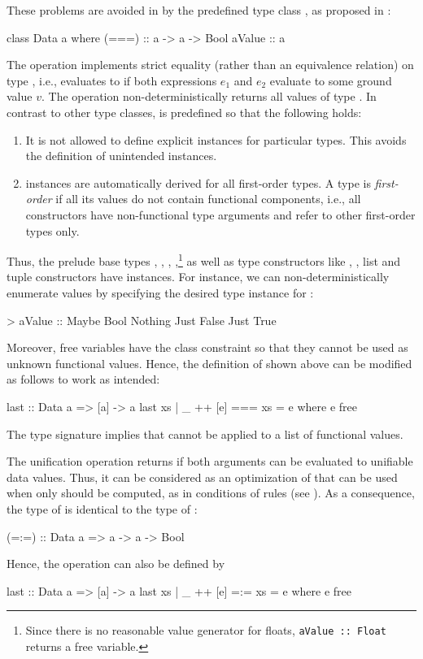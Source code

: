 These problems are avoided in \CYS by the predefined type class
,
as proposed in \cite{HanusTeegen20}:
%
\begin{curry}
class Data a where
  (===)  :: a -> a -> Bool
  aValue :: a
\end{curry}
%
The operation \ccode{===}\pindex{===} implements strict equality
(rather than an equivalence relation) on type ,
i.e.,  evaluates to 
if both expressions $e_1$ and $e_2$ evaluate to some ground value $v$.
The operation  non-deterministically returns
all values of type .
In contrast to other type classes,  is predefined
so that the following holds:
%
\begin{enumerate}
\item
It is not allowed to define explicit  instances
for particular types. This avoids the definition of unintended instances.
\item
{} instances are automatically derived
for all first-order types.
A type is \emph{first-order} if all its values
do not contain functional components,
i.e., all constructors have non-functional type arguments and
refer to other first-order types only.
\end{enumerate}
%
Thus, the prelude base types , , ,
,\footnote{Since there is no reasonable value generator
for floats, \texttt{aValue~::~Float} returns a free variable.}
 as well as type constructors like
, , list and tuple constructors
have  instances.
For instance, we can non-deterministically enumerate values
by specifying the desired type instance for :
%
\begin{curry}
> aValue :: Maybe Bool
Nothing
Just False
Just True
\end{curry}
%
Moreover, free variables have the class constraint 
so that they cannot be used as unknown functional values.
Hence, the definition of  shown above
can be modified as follows to work as intended:
%
\begin{curry}
last :: Data a => [a] -> a
last xs | _ ++ [e] === xs = e
  where e free
\end{curry}
%
The type signature implies that  cannot be applied
to a list of functional values.

The unification operation \ccode{=:=} returns 
if both arguments can be evaluated to unifiable data values.
Thus, it can be considered as an optimization of \ccode{===}
that can be used when only  should be computed,
as in conditions of rules (see \cite{AntoyHanus17FAoC}).
As a consequence, the type of \ccode{=:=} is identical
to the type of \ccode{===}:
%
\begin{curry}
(=:=) :: Data a => a -> a -> Bool
\end{curry}
%
Hence, the operation  can also be defined by
%
\begin{curry}
last :: Data a => [a] -> a
last xs | _ ++ [e] =:= xs = e
  where e free
\end{curry}
%

